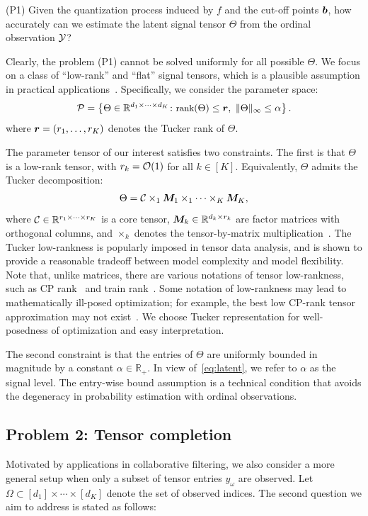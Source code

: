 \documentclass[11pt]{article}
\theoremstyle{plain}
\theoremstyle{definition}
\begin{document}
(P1) Given the quantization process induced by $f$ and the cut-off points $\bm{b}$, how accurately can we estimate the latent signal tensor $\Theta$ from the ordinal observation $\mathcal{Y}$?

Clearly, the problem (P1) cannot be solved uniformly for all possible $\Theta$. We focus on a class of ``low-rank'' and ``flat'' signal tensors, which is a plausible assumption in practical applications~\cite{zhou2013tensor,bhaskar20151}. Specifically, we consider the parameter space:
\begin{equation}\label{eq:space}
\small \mathcal{P}=\left\{\Theta\in\mathbb{R}^{d_1\times \cdots \times d_K} \colon \text{rank}(\Theta)\leq \bm{r},\ \lVert\Theta\rVert_\infty\leq \alpha\right\}.
\end{equation}
where $\bm{r}=(r_1,\ldots,r_K)$ denotes the Tucker rank of $\Theta$.

The parameter tensor of our interest satisfies two constraints. The first is that $\Theta$ is a low-rank tensor, with $r_k=\mathcal{O}(1)$ for all $k\in[K]$. Equivalently, $\Theta$ admits the Tucker decomposition:
\begin{equation}\label{eq:Tucker}
\Theta=\mathcal{C}\times_1\bm M_1\times_1 \cdots \times_K \bm M_K,
\end{equation}
where $\mathcal{C}\in\mathbb{R}^{r_1\times \cdots \times r_K}$ is a core tensor, $\bm M_k\in\mathbb{R}^{d_k\times r_k}$ are factor matrices with orthogonal columns, and $\times_k$ denotes the tensor-by-matrix multiplication~\cite{kolda2009tensor}. The Tucker low-rankness is popularly imposed in tensor data analysis, and is shown to provide a reasonable tradeoff between model complexity and model flexibility. Note that, unlike matrices, there are various notations of tensor low-rankness, such as CP rank~\cite{hitchcock1927expression} and train rank~\cite{oseledets2011tensor}. Some notation of low-rankness may lead to mathematically ill-posed optimization; for example, the best low CP-rank tensor approximation may not exist~\cite{de2008tensor}. We choose Tucker representation for well-posedness of optimization and easy interpretation.

The second constraint is that the entries of $\Theta$ are uniformly bounded in magnitude by a constant $\alpha \in \mathbb{R}_{+}$. In view of~\eqref{eq:latent}, we refer to $\alpha$ as the signal level. The entry-wise bound assumption is a technical condition that avoids the degeneracy in probability estimation with ordinal observations.

\subsection{Problem 2: Tensor completion}
Motivated by applications in collaborative filtering, we also consider a more general setup when only a subset of tensor entries $y_\omega$ are observed. Let $\Omega\subset[d_1]\times \cdots\times[d_K]$ denote the set of observed indices. The second question we aim to address is stated as follows:
\end{document}
